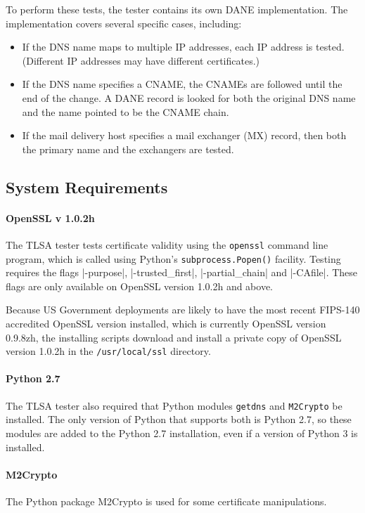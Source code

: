 \documentclass[preprint,3p]{elsarticle}
\begin{document}
To perform these tests, the tester contains its own DANE
implementation. The implementation covers several specific cases,
including:

\begin{itemize}
\item If the DNS name maps to multiple IP addresses, each IP address
  is tested. (Different IP addresses may have different certificates.)
\item If the DNS name specifies a CNAME, the CNAMEs are followed until
  the end of the change. A DANE record is looked for both the original
  DNS name and the name pointed to be the CNAME chain.
\item If the mail delivery host specifies a mail exchanger (MX)
  record, then both the primary name and the exchangers are tested.
\end{itemize}

\subsection{System Requirements}

\paragraph{OpenSSL v 1.0.2h}
The TLSA tester tests certificate validity using the \verb+openssl+
command line program, which is called using Python's \verb+subprocess.Popen()+
facility. Testing requires the flags |-purpose|, |-trusted_first|,
|-partial_chain| and |-CAfile|. These flags are only available on
OpenSSL version 1.0.2h and above.

Because US Government deployments are likely to have the
most recent FIPS-140 accredited OpenSSL version installed, which is
currently OpenSSL version 0.9.8zh, the installing scripts download and
install a private copy of OpenSSL version 1.0.2h in the
\verb+/usr/local/ssl+ directory.

\paragraph{Python 2.7}
The TLSA tester also required that Python modules \verb+getdns+ and
\verb+M2Crypto+ be installed. The only version of Python that supports
both is Python 2.7, so these modules are added to the Python 2.7
installation, even if a version of Python 3 is installed.

\paragraph{M2Crypto} The Python package M2Crypto is used for some
certificate manipulations.
\end{document}

